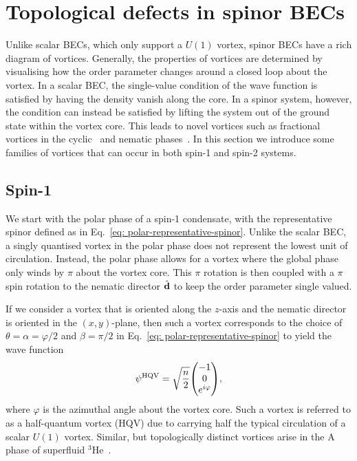 \section{Topological defects in spinor BECs}
Unlike scalar BECs, which only support a \(U(1)\) vortex, spinor BECs have a
rich diagram of vortices.
Generally, the properties of vortices are determined by visualising how the
order parameter changes around a closed loop about the vortex.
In a scalar BEC, the single-value condition of the wave function is satisfied
by having the density vanish along the core.
In a spinor system, however, the condition can instead be satisfied by lifting
the system out of the ground state within the vortex core.
This leads to novel vortices such as fractional vortices in the
cyclic~\cite{Semenoff2007,Huhtamaki2009} and nematic
phases~\cite{Leonhardt2000, Seo2015}.
In this section we introduce some families of vortices that can occur
in both spin-1 and spin-2 systems.

\subsection{Spin-1}
We start with the polar phase of a spin-1 condensate, with the representative
spinor defined as in Eq.~\eqref{eq: polar-representative-spinor}.
Unlike the scalar BEC, a singly quantised vortex in the polar phase does not
represent the lowest unit of circulation.
Instead, the polar phase allows for a vortex where the global phase only winds
by \(\pi \) about the vortex core.
This \(\pi \) rotation is then coupled with a \(\pi \) spin rotation to the
nematic director \(\hat{\vb{d}}\) to keep the order parameter single valued.

If we consider a vortex that is oriented along the \(z\)-axis and the nematic
director is oriented in the \((x, y)\)-plane, then such a vortex corresponds to
the choice of \(\theta=\alpha=\varphi/2 \) and \(\beta = \pi/2\) in
Eq.~\eqref{eq: polar-representative-spinor} to yield the wave function
\begin{equation}
    \psi^\mathrm{HQV} = \sqrt{\frac{n}{2}} \mqty(
        -1 \\
        0 \\
        e^{i\varphi}
    ),
    \label{eq: polar-HQV}
\end{equation}
where \(\varphi \) is the azimuthal angle about the vortex core.
Such a vortex is referred to as a half-quantum vortex (HQV) due to carrying
half the typical circulation of a scalar \(U(1)\) vortex.
Similar, but topologically distinct vortices arise in the A phase of
superfluid \( ^3\)He~\cite{Salomaa1985, Salomaa1987}.

